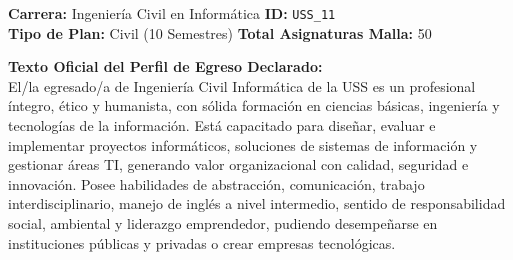 \documentclass[11pt,a4paper]{article}
\begin{document}
\begin{tcolorbox}[fichaStyle, title={UNIVERSIDAD 11: Universidad San Sebastián (USS)}]
\small\sffamily
\textbf{Carrera:} Ingeniería Civil en Informática \hfill \textbf{ID:} \texttt{USS\_11} \\
\textbf{Tipo de Plan:} Civil (10 Semestres) \hfill \textbf{Total Asignaturas Malla:} 50

\tcbline

\textbf{Texto Oficial del Perfil de Egreso Declarado:}\\[4pt]
{\small\rmfamily
El/la egresado/a de Ingeniería Civil Informática de la USS es un profesional íntegro, ético y humanista, con sólida formación en ciencias básicas, ingeniería y tecnologías de la información. Está capacitado para diseñar, evaluar e implementar proyectos informáticos, soluciones de sistemas de información y gestionar áreas TI, generando valor organizacional con calidad, seguridad e innovación. Posee habilidades de abstracción, comunicación, trabajo interdisciplinario, manejo de inglés a nivel intermedio, sentido de responsabilidad social, ambiental y liderazgo emprendedor, pudiendo desempeñarse en instituciones públicas y privadas o crear empresas tecnológicas.
}
\end{tcolorbox}

\vspace{10pt}
\end{document}
